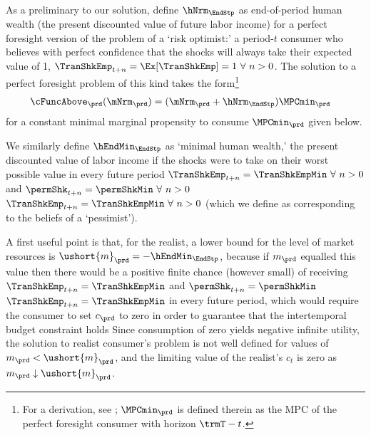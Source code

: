   As a preliminary to our solution, define $\hNrm_{\EndStp}$ as end-of-period human wealth (the present discounted value of future labor income) for a perfect foresight version of the problem of a `risk optimist:' a period-$t$ consumer who believes with perfect confidence that the shocks will always take their expected value of   {1, $\TranShkEmp_{t+n} = \Ex[\TranShkEmp]=1~\forall~n>0$.}  The solution to a perfect foresight problem of this kind takes the form\footnote{For a derivation, see \cite{BufferStockTheory}; $\MPCmin_{\prd}$ is defined therein as the MPC of the perfect foresight consumer with horizon $\trmT-t$.}
  \begin{equation}\begin{gathered}\begin{aligned}
        \cFuncAbove_{\prd}(\mNrm_{\prd})  & = (\mNrm_{\prd} + \hNrm_{\EndStp})\MPCmin_{\prd} \label{eq:cFuncAbove}
      \end{aligned}\end{gathered}\end{equation}
  for a constant minimal marginal propensity to consume $\MPCmin_{\prd}$ given below.

  We similarly define $\hEndMin_{\EndStp}$ as `minimal human wealth,' the
  present discounted value of labor income if the shocks were to take on
  their worst possible value in every future period \permShkOn
  {$\TranShkEmp_{t+n} = \TranShkEmpMin ~\forall~n>0$ and $\permShk_{t+n} =
    \permShkMin ~\forall~n>0$} {$\TranShkEmp_{t+n} = \TranShkEmpMin
    ~\forall~n>0$} (which we define as corresponding to the beliefs of a
  `pessimist').


  A first useful point is that, for the realist, a lower bound for the
  level of market resources is $\ushort{m}_{\prd} = -\hEndMin_{\EndStp}$, because
  if $m_{\prd}$ equalled this value then there would be a positive finite
  chance (however small) of receiving \permShkOn
  {$\TranShkEmp_{t+n}=\TranShkEmpMin$ and $\permShk_{t+n}=\permShkMin$}
  {$\TranShkEmp_{t+n}=\TranShkEmpMin$}
  in
  every future period, which would require the consumer to set $c_{\prd}$
  to zero in order to guarantee that the intertemporal budget constraint
  holds  Since consumption of zero yields negative
  infinite utility, the solution to realist consumer's problem is not well
  defined for values of $m_{\prd} < \ushort{m}_{\prd}$, and the limiting
  value of the realist's $c_t$ is zero as $m_{\prd} \downarrow \ushort{m}_{\prd}$.

